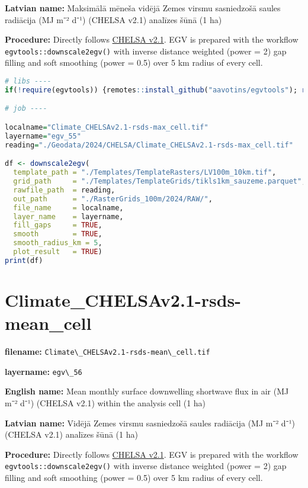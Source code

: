 \documentclass[
]{book}
\newcommand{\passthrough}[1]{#1}
\begin{document}
\textbf{Latvian name:} Maksimālā mēneša vidējā Zemes virsmu sasniedzošā saules radiācija (MJ m⁻² d⁻¹) (CHELSA v2.1) analīzes šūnā (1 ha)

\textbf{Procedure:} Directly follows \hyperref[Ch04.11]{CHELSA v2.1}. EGV is prepared with the
workflow \passthrough{\lstinline!egvtools::downscale2egv()!} with inverse distance weighted (power = 2)
gap filling and soft smoothing (power = 0.5) over 5 km radius of every cell.

\begin{lstlisting}[language=R]
# libs ----
if(!require(egvtools)) {remotes::install_github("aavotins/egvtools"); require(egvtools)}

# job ----

localname="Climate_CHELSAv2.1-rsds-max_cell.tif"
layername="egv_55"
reading="./Geodata/2024/CHELSA/Climate_CHELSAv2.1-rsds-max_cell.tif"

df <- downscale2egv(
  template_path = "./Templates/TemplateRasters/LV100m_10km.tif",
  grid_path     = "./Templates/TemplateGrids/tikls1km_sauzeme.parquet",
  rawfile_path  = reading,
  out_path      = "./RasterGrids_100m/2024/RAW/",
  file_name     = localname,
  layer_name    = layername,
  fill_gaps     = TRUE,
  smooth        = TRUE,
  smooth_radius_km = 5,
  plot_result   = TRUE)
print(df)
\end{lstlisting}

\section{Climate\_CHELSAv2.1-rsds-mean\_cell}\label{ch06.056}

\textbf{filename:} \passthrough{\lstinline!Climate\_CHELSAv2.1-rsds-mean\_cell.tif!}

\textbf{layername:} \passthrough{\lstinline!egv\_56!}

\textbf{English name:} Mean monthly surface downwelling shortwave flux in air (MJ m⁻² d⁻¹) (CHELSA v2.1) within the analysis cell (1 ha)

\textbf{Latvian name:} Vidējā Zemes virsmu sasniedzošā saules radiācija (MJ m⁻² d⁻¹) (CHELSA v2.1) analīzes šūnā (1 ha)

\textbf{Procedure:} Directly follows \hyperref[Ch04.11]{CHELSA v2.1}. EGV is prepared with the
workflow \passthrough{\lstinline!egvtools::downscale2egv()!} with inverse distance weighted (power = 2)
gap filling and soft smoothing (power = 0.5) over 5 km radius of every cell.
\end{document}
